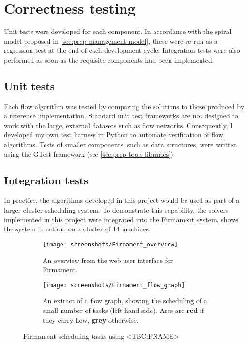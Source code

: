 \section{Correctness testing}



Unit tests were developed for each component. In accordance with the spiral model proposed in \cref{sec:prep-management-model}, these were re-run as a regression test at the end of each development cycle. Integration tests were also performed as soon as the requisite components had been implemented.

\subsection{Unit tests} \label{sec:eval-testing-unit}

Each flow algorithm was tested by comparing the solutions to those produced by a reference implementation. Standard unit test frameworks are not designed to work with the large, external datasets such as flow networks. Consequently, I developed my own test harness in Python to automate verification of flow algorithms. Tests of smaller components, such as data structures, were written using the GTest framework (see \cref{sec:prep-tools-libraries}).

\subsection{Integration tests} \label{sec:eval-test-integration}

In practice, the algorithms developed in this project would be used as part of a larger cluster scheduling system. To demonstrate this capability, the solvers implemented in this project were integrated into the Firmament system.  shows the system in action, on a cluster of 14 machines.

\begin{figure}
    \begin{subfigure}{\textwidth}
        \texttt{[image: screenshots/Firmament\_overview]}
        \caption{An overview from the web user interface for Firmament.}
    \end{subfigure}
    \begin{subfigure}{\textwidth}
        \texttt{[image: screenshots/Firmament\_flow\_graph]}
        \caption{An extract of a flow graph, showing the scheduling of a small number of tasks (left hand side). Arcs are \textbf{\color{red} red} if they carry flow, \textbf{\color{gray} grey} otherwise.}
    \end{subfigure}
    \caption[Firmament scheduling tasks]{Firmament scheduling tasks using <TBC:PNAME>}
    \label{fig:firmament-ui}
\end{figure}

